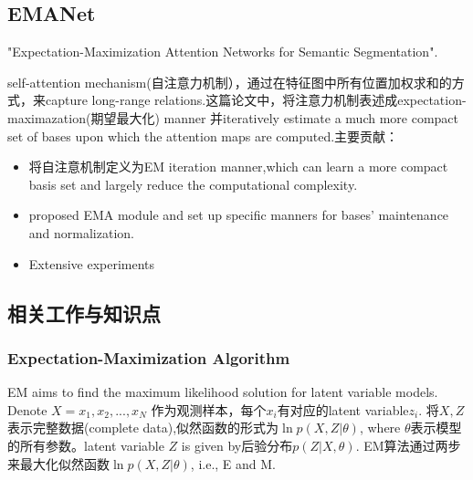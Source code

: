 \documentclass{article}
\begin{document}
\subsection{EMANet}
"Expectation-Maximization Attention Networks for Semantic Segmentation".

self-attention mechanism(自注意力机制），通过在特征图中所有位置加权求和的方式，来capture long-range relations.这篇论文中，将注意力机制表述成expectation-maximazation(期望最大化) manner 并iteratively estimate a much more compact set of bases upon which the attention maps are computed.主要贡献：
\begin{itemize}
\item 将自注意机制定义为EM iteration manner,which can learn a more compact basis set and largely reduce the computational complexity.
\item proposed EMA module and set up specific manners for bases' maintenance and normalization.
\item Extensive experiments
\end{itemize}

\subsection{相关工作与知识点}
\subsubsection{Expectation-Maximization Algorithm}
EM aims to find the maximum likelihood solution for latent variable models. Denote $X={x_1,x_2,...,x_N}	$ 作为观测样本，每个$x_i$有对应的latent variable$z_i$. 将${X,Z}$表示完整数据(complete data),似然函数的形式为$\ln p(X,Z|\theta)$, where $\theta$表示模型的所有参数。latent variable $Z$ is given by后验分布$p(Z|X,\theta)$. EM算法通过两步来最大化似然函数$\ln p(X,Z|\theta)$, i.e., E and M.





\end{document}
